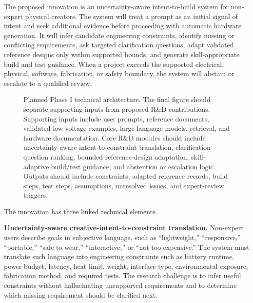 
The proposed innovation is an uncertainty-aware intent-to-build system for non-expert physical creators. 
The system will treat a prompt as an initial signal of intent and seek additional evidence before proceeding with automatic hardware generation.
It will infer candidate engineering constraints, identify missing or conflicting requirements, ask targeted clarification questions, adapt validated reference designs only within supported bounds, and generate skill-appropriate build and test guidance. When a project exceeds the supported electrical, physical, software, fabrication, or safety boundary, the system will abstain or escalate to a qualified review.

\begin{figure}[H]
\centering
{}
\caption{Planned Phase I technical architecture. The final figure should separate supporting inputs from proposed R\&D contributions. Supporting inputs include user prompts, reference documents, validated low-voltage examples, large language models, retrieval, and hardware documentation. Core R\&D modules should include uncertainty-aware intent-to-constraint translation, clarification-question ranking, bounded reference-design adaptation, skill-adaptive build/test guidance, and abstention or escalation logic. Outputs should include constraints, adapted reference records, build steps, test steps, assumptions, unresolved issues, and expert-review triggers.}
\label{fig:technical_architecture}
\end{figure}

The innovation has three linked technical elements.

\textbf{Uncertainty-aware creative-intent-to-constraint translation.} Non-expert users describe goals in subjective language, such as ``lightweight,'' ``responsive,'' ``portable,'' ``safe to wear,'' ``interactive,'' or ``not too expensive.'' The system must translate such language into engineering constraints such as battery runtime, power budget, latency, heat limit, weight, interface type, environmental exposure, fabrication method, and required tests. The research challenge is to infer useful constraints without hallucinating unsupported requirements and to determine which missing requirement should be clarified next.

